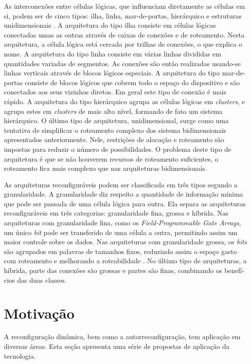 \documentclass[11pt,a4paper,oneside]{book}
\begin{document}
As interconex\~oes entre c\'elulas l\'ogicas, que influenciam diretamente as c\'elulas em si, podem ser de cinco tipos: ilha, linha, mar-de-portas, hier\'arquico e estruturas unidimensionais \cite{vassiliadis2007fine}.
A arquitetura do tipo ilha consiste em c\'elulas l\'ogicas conectadas umas as outras atrav\'es de caixas de conex\~oes e de roteamento.
Nesta arquitetura, a c\'elula l\'ogica est\'a cercada por trilhas de conex\~oes, o que explica o nome.
A arquitetura do tipo linha consiste em v\'arias linhas divididas em quantidades variadas de segmentos.
As conex\~oes s\~ao ent\~ao realizadas usando-se linhas verticais atrav\'es de blocos l\'ogicos especiais.
A arquitetura do tipo mar-de-portas consiste de blocos l\'ogicos que cobrem todo o espa\c{c}o do dispositivo e s\~ao conectados aos seus vizinhos diretos.
Em geral este tipo de conex\~ao \'e mais r\'apido.
A arquitetura do tipo hier\'arquico agrupa as c\'elulas l\'ogicas em \textit{clusters}, e agrupa estes em \textit{clusters} de mais alto n\'i­vel, formando de fato um sistema hier\'arquico.
O \'ultimo tipo de arquitetura, unidimensional, surge como uma tentativa de simplificar o roteamento complexo dos sistema bidimensionais apresentados anteriormente.
Nele, restri\c{c}\~oes de aloca\c{c}\~ao e roteamento s\~ao impostas para reduzir o n\'umero de possibilidades.
O problema deste tipo de arquitetura \'e que se n\~ao houverem recursos de roteamento suficientes, o roteamento fica mais complexo que nas arquiteturas bidimensionais.

As arquiteturas reconfigur\'aveis podem ser classificada em tr\^es tipos segundo a granularidade.
A granularidade diz respeito a quantidade de informa\c{c}\~ao m\'i­nima que pode ser passada de uma c\'elula l\'ogica para outra.
Ela separa as arquiteturas reconfigur\'aveis em tr\^es categorias: granularidade fina, grossa e h\'i­brida.
Nas arquiteturas com granularidade fina, como os \textit{Field-Programmable Gate Arrays}, um \'unico \textit{bit} pode ser transferido de uma c\'elula a outra, permitindo assim um maior controle sobre os dados.
Nas arquiteturas com granularidade grossa, os \textit{bits} s\~ao agrupados em palavras de tamanhos fixos, reduzindo assim o espa\c{c}o gasto com roteamento e melhorando a roteabilidade \cite{Hartenstein2001}.
No \'ultimo tipo de arquiteturas, a h\'i­brida, parte das conex\~oes s\~ao grossas e partes s\~ao finas, combinando os benef\'i­cios das duas classes.

\section{Motivação}
A reconfiguração dinâmica, bem como a autorreconfiguração, tem aplicação em diversas áreas.
Esta seção apresenta uma série de propostas de aplicação da tecnologia.
\end{document}
